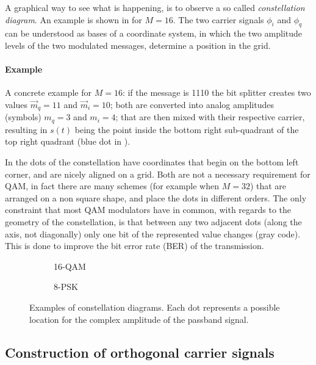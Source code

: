 A graphical way to see what is happening, is to observe a so called \emph{constellation diagram}. An example is shown in  for \(M = 16\). The two carrier signals \(\phi_i\) and \(\phi_q\) can be understood as bases of a coordinate system, in which the two amplitude levels of the two modulated messages, determine a position in the grid.

\paragraph{Example}

A concrete example for \(M = 16\): if the message is 1110 the bit splitter creates two values \(\vec{m}_q = 11\) and \(\vec{m}_i = 10\); both are converted into analog amplitudes (symbols) \(m_q = 3\) and \(m_i = 4\); that are then mixed with their respective carrier, resulting in \(s(t)\) being the point inside the bottom right sub-quadrant of the top right quadrant (blue dot in ).

In  the dots of the constellation have coordinates that begin on the bottom left corner, and are nicely aligned on a grid. Both are not a necessary requirement for QAM, in fact there are many schemes (for example when \(M = 32\)) that are arranged on a non square shape, and place the dots in different orders. The only constraint that most QAM modulators have in common, with regards to the geometry of the constellation, is that between any two adjacent dots (along the axis, not diagonally) only one bit of the represented value changes (gray code). This is done to improve the bit error rate (BER) of the transmission.

\begin{figure}
	\hfill
	\begin{subfigure}{.4\linewidth}
		
		\caption{16-QAM\label{fig:qam-constellation}}
	\end{subfigure}
	\hfill
	\begin{subfigure}{.4\linewidth}
		
		\caption{8-PSK\label{fig:psk-constellation}}
	\end{subfigure}
	\hfill
	\caption{
		Examples of constellation diagrams. Each dot represents a possible location for the complex amplitude of the passband signal.
	}
\end{figure}

\subsection{Construction of orthogonal carrier signals}


